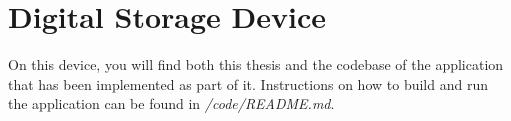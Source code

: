 \chapter*{Digital Storage Device}

On this device, you will find both this thesis and the codebase of the application that has been implemented as part of it. Instructions on how to build and run the application can be found in \textit{/code/README.md}.
